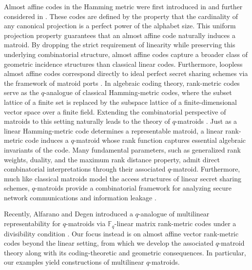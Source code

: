 \documentclass[a4paper,11pt,reqno]{article}
\newcommand{\F}{\mathbb{F}}
\theoremstyle{plain} \numberwithin{equation}{section}
\theoremstyle{definition}
\begin{document}
Almost affine codes in the Hamming metric were first introduced in \cite{AlmostAffineCodes} and further considered in \cite{10.1109/TIT.2017.2654456}. These codes are defined by the property that the cardinality of any canonical projection is a perfect power of the alphabet size. This uniform projection property guarantees that an almost affine code naturally induces a matroid. By dropping the strict requirement of linearity while preserving this underlying combinatorial structure, almost affine codes capture a broader class of geometric incidence structures than classical linear codes. Furthermore, loopless almost affine codes correspond directly to ideal perfect secret sharing schemes via the framework of matroid ports \cite{Lehman,brickell_davenport,farre_padro2007}. In algebraic coding theory, rank-metric codes serve as the $q$-analogue of classical Hamming-metric codes, where the subset lattice of a finite set is replaced by the subspace lattice of a finite-dimensional vector space over a finite field. Extending the combinatorial perspective of matroids to this setting naturally leads to the theory of $q$-matroids \cite{JurriusPellikaan2018,Gorla_2019,Shiromoto}. Just as a linear Hamming-metric code determines a representable matroid, a linear rank-metric code induces a $q$-matroid whose rank function captures essential algebraic invariants of the code. Many fundamental parameters, such as generalized rank weights, duality, and the maximum rank distance property, admit direct combinatorial interpretations through their associated $q$-matroid. Furthermore, much like classical matroids model the access structures of linear secret sharing schemes, $q$-matroids provide a combinatorial framework for analyzing secure network communications and information leakage \cite{qPorts1,qPorts2}.

Recently, Alfarano and Degen introduced a $q$-analogue of multilinear representability for $q$-matroids via $\F_q$-linear matrix rank-metric codes under a divisibility condition \cite{alfarano2026representabilityqmatroidsrankmetriccodes}. Our focus instead is on almost affine vector rank-metric codes beyond the linear setting, from which we develop the associated $q$-matroid theory along with its coding-theoretic and geometric consequences. In particular, our examples yield constructions of multilinear $q$-matroids.
\end{document}
